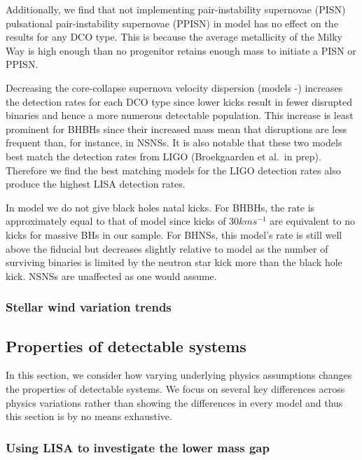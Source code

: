 Additionally, we find that not implementing pair-instability supernovae (PISN) pulsational pair-instability supernovae (PPISN) in model \modNoPISN{} has no effect on the results for any DCO type. This is because the average metallicity of the Milky Way is high enough than no progenitor retains enough mass to initiate a PISN or PPISN.

Decreasing the core-collapse supernova velocity dispersion (models \modSigLow{}-\modSigLower{}) increases the detection rates for each DCO type since lower kicks result in fewer disrupted binaries and hence a more numerous detectable population. This increase is least prominent for BHBHs since their increased mass mean that disruptions are less frequent than, for instance, in NSNSs. It is also notable that these two models best match the detection rates from LIGO (Broekgaarden et al.\ in prep). Therefore we find the best matching models for the LIGO detection rates also produce the highest LISA detection rates.

In model \modNoBH{} we do not give black holes natal kicks. For BHBHs, the rate is approximately equal to that of model \modSigLower{} since kicks of $30 \unit{km}{s^{-1}}$ are equivalent to no kicks for massive BHs in our sample. For BHNSs, this model's rate is still well above the fiducial but decreases slightly relative to model \modSigLower{} as the number of surviving binaries is limited by the neutron star kick more than the black hole kick. NSNSs are unaffected as one would assume.

\subsubsection{Stellar wind variation trends}


\subsection{Properties of detectable systems}\label{sec:property_variations}

In this section, we consider how varying underlying physics assumptions changes the properties of detectable systems. We focus on several key differences across physics variations rather than showing the differences in every model and thus this section is by no means exhaustive.

\subsubsection{Using LISA to investigate the lower mass gap}\label{sec:lower_mass_gap}

